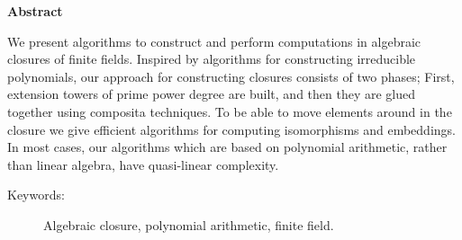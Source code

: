 
\vspace*{2in}
\begin{center}
	\large
	\textbf{Abstract}
\end{center}
\vspace*{1cm}

We present algorithms to construct and perform computations in algebraic closures of finite 
fields. Inspired by algorithms for constructing irreducible polynomials, our approach for 
constructing closures consists of two phases; First, extension towers of prime power degree are 
built, and then they are glued together using composita techniques. To be able to move elements 
around in the closure we give efficient algorithms for computing isomorphisms and embeddings. In 
most cases, our algorithms which are based on polynomial arithmetic, rather than linear algebra, 
have quasi-linear complexity.
 
\vspace*{1cm}
\begin{description}
	\item[Keywords:] Algebraic closure, polynomial arithmetic, finite field.
\end{description}